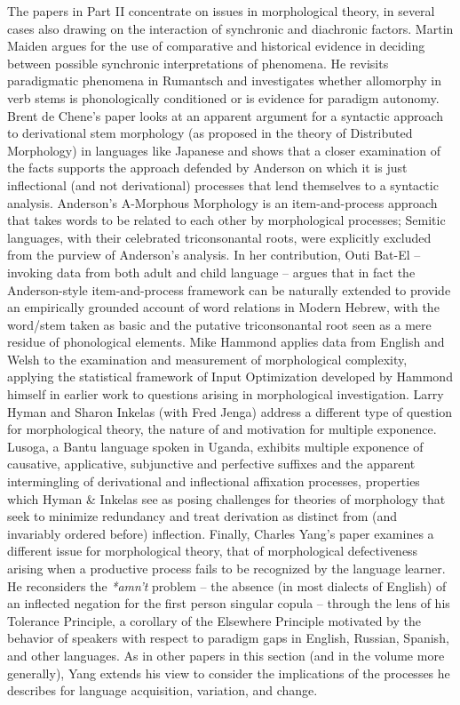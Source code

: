 \begin{refsection}
The papers in Part II concentrate on issues in morphological theory, in several cases also drawing on the interaction of synchronic and diachronic factors. Martin Maiden argues for the use of comparative and historical evidence in deciding between possible synchronic interpretations of phenomena. He revisits paradigmatic phenomena in Rumantsch and investigates whether allomorphy in verb stems is phonologically conditioned or is evidence for paradigm autonomy. Brent de Chene's paper looks at an apparent argument for a syntactic approach to derivational stem morphology (as proposed in the theory of Distributed Morphology) in languages like Japanese and shows that a closer examination of the facts supports the approach defended by Anderson on which it is just inflectional (and not derivational) processes that lend themselves to a syntactic analysis. Anderson's A-Morphous Morphology is an item-and-process approach that takes words to be related to each other by morphological processes; Semitic languages, with their celebrated triconsonantal roots, were explicitly excluded from the purview of Anderson's analysis. In her contribution, Outi Bat-El -- invoking data from both adult and child language -- argues that in fact the Anderson-style item-and-process framework can be naturally extended to provide an empirically grounded account of word relations in Modern Hebrew, with the word/stem taken as basic and the putative triconsonantal root seen as a mere residue of phonological elements.  Mike Hammond applies data from English and Welsh to the examination and measurement of morphological complexity, applying the statistical framework of Input Optimization developed by Hammond himself in earlier work to questions arising in morphological investigation. Larry Hyman and Sharon Inkelas (with Fred Jenga) address a different type of question for morphological theory, the nature of and motivation for multiple exponence. Lusoga, a Bantu language spoken in Uganda, exhibits multiple exponence of causative, applicative, subjunctive and perfective suffixes and the apparent intermingling of derivational and inflectional affixation processes, properties which Hyman \& Inkelas see as posing challenges for theories of morphology that seek to minimize redundancy and treat derivation as distinct from (and invariably ordered before) inflection. Finally, Charles Yang's paper examines a different issue for morphological theory, that of morphological defectiveness arising when a productive process fails to be recognized by the language learner. He reconsiders the \textit{*amn't} problem -- the absence (in most dialects of English) of an inflected negation for the first person singular copula -- through the lens of his Tolerance Principle, a corollary of the Elsewhere Principle motivated by the behavior of speakers with respect to paradigm gaps in English, Russian, Spanish, and other languages.  As in other papers in this section (and in the volume more generally), Yang extends his view to consider the implications of the processes he describes for language acquisition, variation, and change.  


\end{refsection}
